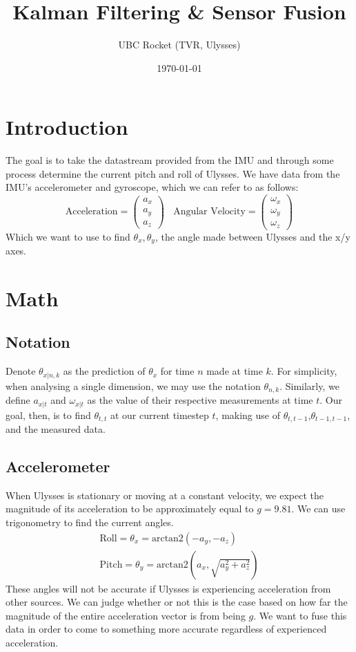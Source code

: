 \documentclass{article}
\title{Kalman Filtering \& Sensor Fusion}
\author{UBC Rocket (TVR, Ulysses)}
\date{\today}
\begin{document}
\maketitle %

\section{Introduction}

The goal is to take the datastream provided from the IMU and through some process determine the current pitch and roll of Ulysses. 
We have data from the IMU's accelerometer and gyroscope, which we can refer to as follows:
$$
\text{Acceleration} =
\begin{pmatrix}
a_x\\
a_y\\
a_z
\end{pmatrix}
\ \ \ \
\text{Angular Velocity} =
\begin{pmatrix}
\omega_x\\
\omega_y\\
\omega_z
\end{pmatrix}
$$
Which we want to use to find $\theta_x, \theta_y$, the angle made between Ulysses and the x/y axes.

\section{Math}
\subsection{Notation}
Denote $\theta_{x|n,k}$ as the prediction of $\theta_x$ for time $n$ made at time $k$. For simplicity, when analysing a single dimension, we may use the notation $\theta_{n,k}$.
Similarly, we define $a_{x|t}$ and $\omega_{x|t}$ as the value of their respective measurements at time $t$.
Our goal, then, is to find $\theta_{t,t}$ at our current timestep $t$, making use of $\theta_{t,t-1}$,$\theta_{t-1,t-1}$, and the measured data.
\subsection{Accelerometer}
When Ulysses is stationary or moving at a constant velocity, we expect the magnitude of its acceleration to be approximately equal to $g=9.81$. 
We can use trigonometry to find the current angles.
\[
\begin{gathered}
\text{Roll}=\theta_x=\text{arctan}2(-a_y, -a_z)
\\\text{Pitch}=\theta_y=\text{arctan}2(a_x, \sqrt{a_y^2 + a_z^2})
\end{gathered}
\]
These angles will not be accurate if Ulysses is experiencing acceleration from other sources. 
We can judge whether or not this is the case based on how far the magnitude of the entire acceleration vector is from being $g$.
We want to fuse this data in order to come to something more accurate regardless of experienced acceleration.
\end{document}
